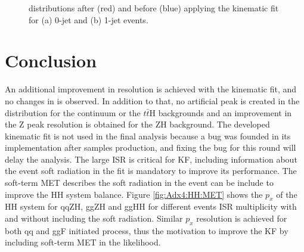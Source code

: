 \begin{figure}[htbp]
   \centering
   \caption{\myy distributions after (red) and before (blue) applying the kinematic fit for (a) 0-jet and (b) 1-jet events.}
   \label{fig:Adx4:HH:myy}
\end{figure}


\section{Conclusion}

An additional improvement in \mbb resolution is achieved with the kinematic fit, and no changes in \myy is observed. In addition to that, no artificial peak is created in the \mbb distribution for the continuum or the $t\bar{t}$H backgrounds and an improvement in the Z peak resolution is obtained for the ZH background. The developed kinematic fit is not used in the final analysis because a bug was founded in its implementation after samples production, and fixing the bug for this round will delay the analysis. The large ISR is critical for \HHyybb KF, including information about the event soft radiation in the fit is mandatory to improve its performance. The soft-term MET describes the soft radiation in the event can be include to improve the HH system balance. Figure \ref{fig:Adx4:HH:MET} shows the $p_x$ of the HH system for qqZH, ggZH and ggHH for different events ISR multiplicity with and without including the soft radiation. Similar $p_x$ resolution is achieved for both qq and ggF initiated process, thus the motivation to improve the KF by including soft-term MET in the likelihood. 

